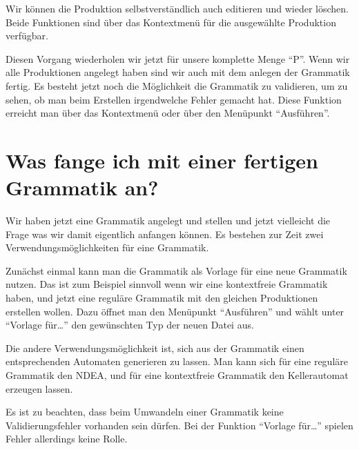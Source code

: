 Wir können die Produktion selbstverständlich auch editieren und wieder löschen.
Beide Funktionen sind über das Kontextmenü für die ausgewählte Produktion
verfügbar.\vspace{10pt}

Diesen Vorgang wiederholen wir jetzt für unsere komplette Menge "`P"'. Wenn wir
alle Produktionen angelegt haben sind wir auch mit dem anlegen der Grammatik
fertig. Es besteht jetzt noch die Möglichkeit die Grammatik zu validieren, um
zu sehen, ob man beim Erstellen irgendwelche Fehler gemacht hat. Diese Funktion
erreicht man über das Kontextmenü oder über den Menüpunkt "`Ausführen"'.

\section{Was fange ich mit einer fertigen Grammatik an?}

Wir haben jetzt eine Grammatik angelegt und stellen und jetzt vielleicht die
Frage was wir damit eigentlich anfangen können. Es bestehen zur Zeit zwei
Verwendungsmöglichkeiten für eine Grammatik.\vspace{10pt}

Zunächst einmal kann man die Grammatik als Vorlage für eine neue Grammatik
nutzen. Das ist zum Beispiel sinnvoll wenn wir eine kontextfreie Grammatik
haben, und jetzt eine reguläre Grammatik mit den gleichen Produktionen
erstellen wollen. Dazu öffnet man den Menüpunkt "`Ausführen"' und wählt unter
"`Vorlage für\ldots"' den gewünschten Typ der neuen Datei aus.\vspace{10pt}

Die andere Verwendungsmöglichkeit ist, sich aus der Grammatik einen
ent\-sprechen\-den Automaten generieren zu lassen. Man kann sich für eine
reguläre Grammatik den NDEA, und für eine kontextfreie Grammatik den Kellerautomat
erzeugen lassen.\vspace{10pt}

Es ist zu beachten, dass beim Umwandeln einer Grammatik keine
Validierungsfehler vorhanden sein dürfen. Bei der Funktion "`Vorlage
für\ldots"' spielen Fehler allerdings keine Rolle.




